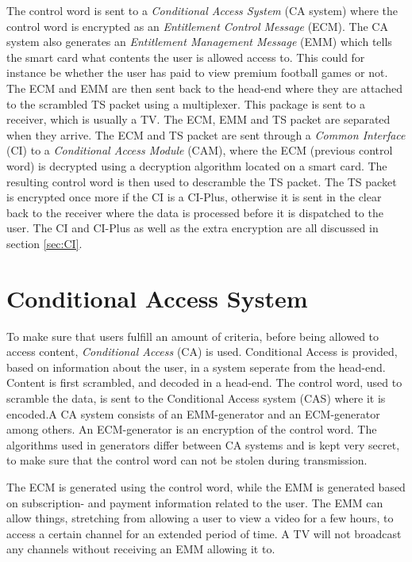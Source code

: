 The control word is sent to a \emph{Conditional Access System} 
(CA system) where the control word is encrypted as an 
\emph{Entitlement Control Message} (ECM). The CA system also generates 
an \emph{Entitlement Management Message} (EMM) which tells the 
smart card what contents the user is allowed access to. This could for 
instance be whether the user has paid to view premium football games or 
not. The ECM and EMM are then sent back to the head-end where they are 
attached to the scrambled TS packet using a multiplexer. 
This package is sent to a receiver, which is usually a TV. The ECM, 
EMM and TS packet are separated when they arrive. The ECM and TS packet 
are sent through a \emph{Common Interface} (CI) to a \emph{Conditional 
Access Module} (CAM), where the ECM (previous control word) is 
decrypted using a decryption algorithm located on a smart card. 
The resulting control word is then used to descramble the TS packet. 
The TS packet is encrypted once more if the CI is a CI-Plus, otherwise 
it is sent in the clear back to the receiver where the data is 
processed before it is dispatched to the user. The CI and CI-Plus as 
well as the extra encryption are all discussed in section \ref{sec:CI}.

\section{Conditional Access System} \label{sec:CAS}
To make sure that users fulfill an amount of criteria, before being 
allowed to access content, \emph{Conditional Access} (CA) is used. 
Conditional Access is provided, based on information about the user, 
in a system seperate from the head-end. Content is first scrambled, and 
decoded in a head-end. The control word, used to scramble the data, is 
sent to the Conditional Access system (CAS) where it is encoded.A CA 
system consists of an EMM-generator and an ECM-generator among others. 
An ECM-generator is an encryption of the control word. The algorithms 
used in generators differ between CA systems and is kept very secret, 
to make sure that the control word can not be stolen during 
transmission.

The ECM is generated using the control word, while the EMM is generated 
based on subscription- and payment information related to the user. The 
EMM can allow things, stretching from allowing a user to view a video 
for a few hours, to access a certain channel for an extended period of 
time. A TV will not broadcast any channels without receiving an EMM 
allowing it to.

